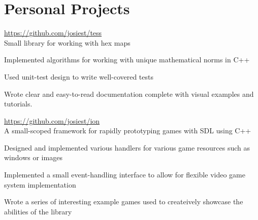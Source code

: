 \documentclass[10pt]{article}
\newenvironment{itemize*}
{\begin{itemize}[leftmargin=*]
    \setlength{\parskip}{0.5pt}}
{\end{itemize}}
\begin{document}
\section*{Personal Projects}
\begin{description}[leftmargin=!,labelwidth=\widthof{\bfseries tess}]

\item[tess] \url{https://github.com/josiest/tess}\\
    Small library for working with hex maps
\end{description}
\begin{itemize*}
\item Implemented algorithms for working with unique mathematical norms in C++
\item Used unit-test design to write well-covered tests
\item Wrote clear and easy-to-read documentation complete with visual examples
      and tutorials.
\end{itemize*}
\vspace{10pt}

\begin{description}[leftmargin=!,labelwidth=\widthof{\bfseries ion library}]
\item[ion library] \url{https://github.com/josiest/ion}\\
    A small-scoped framework for rapidly prototyping games with SDL using C++
\end{description}
\begin{itemize*}
\item Designed and implemented various handlers for various game resources such
      as windows or images
\item Implemented a small event-handling interface to allow for flexible
      video game system implementation
\item Wrote a series of interesting example games used to createively showcase
      the abilities of the library
\end{itemize*}
\end{document}
